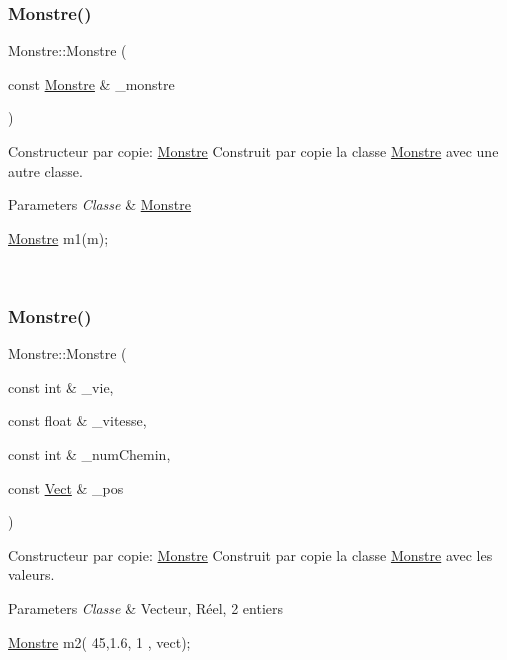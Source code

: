 \subsubsection{\texorpdfstring{Monstre()}{Monstre()}\hspace{0.1cm}{\footnotesize\ttfamily [2/3]}}
{\footnotesize\ttfamily Monstre\+::\+Monstre (\begin{DoxyParamCaption}\item[{const \hyperlink{classMonstre}{Monstre} \&}]{\+\_\+monstre }\end{DoxyParamCaption})}



Constructeur par copie\+: \hyperlink{classMonstre}{Monstre} Construit par copie la classe \hyperlink{classMonstre}{Monstre} avec une autre classe. 


\begin{DoxyParams}{Parameters}
{\em Classe} & \hyperlink{classMonstre}{Monstre} 
\begin{DoxyCode}
\hyperlink{classMonstre}{Monstre} m1(m);
\end{DoxyCode}
 \\
\hline
\end{DoxyParams}
\mbox{\label{classMonstre_aa413ee7bcdcd31bcf5957110c0d31b8a}} 
\subsubsection{\texorpdfstring{Monstre()}{Monstre()}\hspace{0.1cm}{\footnotesize\ttfamily [3/3]}}
{\footnotesize\ttfamily Monstre\+::\+Monstre (\begin{DoxyParamCaption}\item[{const int \&}]{\+\_\+vie,  }\item[{const float \&}]{\+\_\+vitesse,  }\item[{const int \&}]{\+\_\+num\+Chemin,  }\item[{const \hyperlink{classVect}{Vect} \&}]{\+\_\+pos }\end{DoxyParamCaption})}



Constructeur par copie\+: \hyperlink{classMonstre}{Monstre} Construit par copie la classe \hyperlink{classMonstre}{Monstre} avec les valeurs. 


\begin{DoxyParams}{Parameters}
{\em Classe} & Vecteur, Réel, 2 entiers 
\begin{DoxyCode}
\hyperlink{classMonstre}{Monstre} m2(  45,1.6, 1 , vect);
\end{DoxyCode}
 \\
\hline
\end{DoxyParams}


